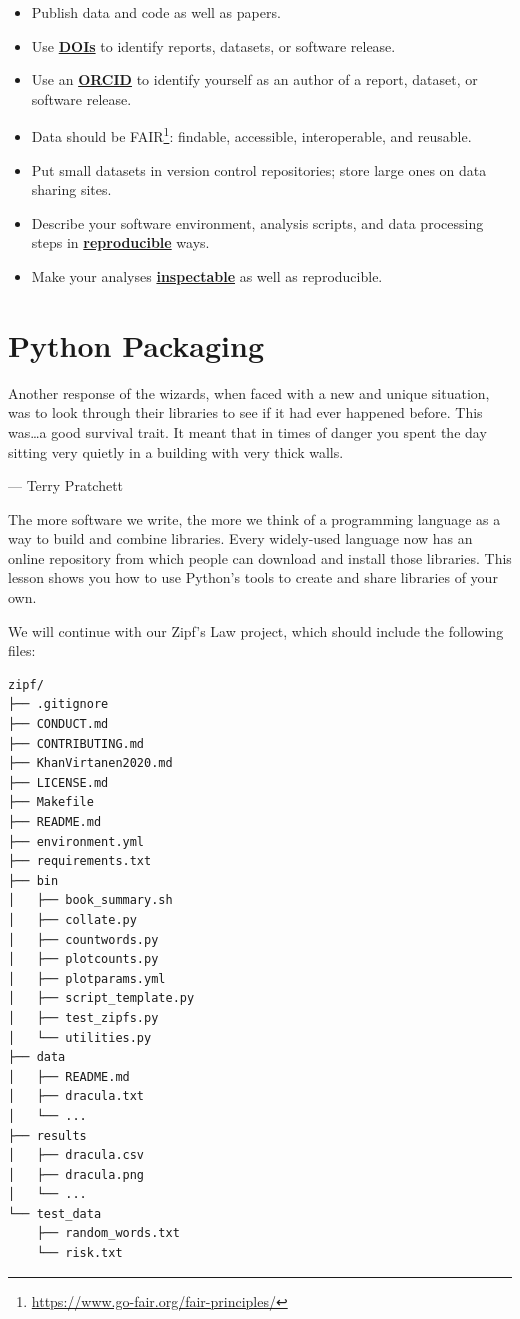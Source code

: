 \documentclass[
]{krantz}
\providecommand{\tightlist}{%
  \setlength{\itemsep}{0pt}\setlength{\parskip}{0pt}}
\renewenvironment{quote}{\begin{VF}}{\end{VF}}
\renewcommand{\href}[2]{#2\footnote{\url{#1}}}
\newcommand{\gref}[2]{\hyperlink{#2}{\textbf{#1}}}
\begin{document}
\begin{itemize}
\tightlist
\item
  Publish data and code as well as papers.
\item
  Use \gref{DOIs}{doi} to identify reports, datasets, or software release.
\item
  Use an \gref{ORCID}{orcid} to identify yourself as an author of a report, dataset, or software release.
\item
  Data should be \href{https://www.go-fair.org/fair-principles/}{FAIR}: findable, accessible, interoperable, and reusable.
\item
  Put small datasets in version control repositories; store large ones on data sharing sites.
\item
  Describe your software environment, analysis scripts, and data processing steps in \gref{reproducible}{reproducible\_research} ways.
\item
  Make your analyses \gref{inspectable}{inspectability} as well as reproducible.
\end{itemize}

\hypertarget{packaging}{%
\chapter{Python Packaging}\label{packaging}}

\begin{quote}
Another response of the wizards,
when faced with a new and unique situation,
was to look through their libraries to see if it had ever happened before.
This was\ldots a good survival trait.
It meant that in times of danger you spent the day sitting very quietly
in a building with very thick walls.

--- Terry Pratchett
\end{quote}

The more software we write,
the more we think of a programming language as a way to build and combine libraries.
Every widely-used language now has an online repository
from which people can download and install those libraries.
This lesson shows you how to use Python's tools to create and share libraries of your own.

We will continue with our Zipf's Law project,
which should include the following files:

\begin{verbatim}
zipf/
├── .gitignore
├── CONDUCT.md
├── CONTRIBUTING.md
├── KhanVirtanen2020.md
├── LICENSE.md
├── Makefile
├── README.md
├── environment.yml
├── requirements.txt
├── bin
│   ├── book_summary.sh
│   ├── collate.py
│   ├── countwords.py
│   ├── plotcounts.py
│   ├── plotparams.yml
│   ├── script_template.py
│   ├── test_zipfs.py
│   └── utilities.py
├── data
│   ├── README.md
│   ├── dracula.txt
│   └── ...
├── results
│   ├── dracula.csv
│   ├── dracula.png
│   └── ...
└── test_data
    ├── random_words.txt
    └── risk.txt
\end{verbatim}
\end{document}
